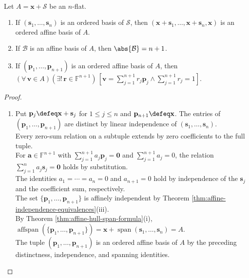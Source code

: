 \begin{theorem} \label{thm:affine-bases-and-barycentric-coordinate-uniqueness} \\
Let $A=\mathbf{x}+\mathcal{S}$ be an $n$-flat.
\begin{enumerate}[label=(\roman*)]
\setlength{\itemsep}{0pt}
\item If $(\mathbf{s}_1,\ldots,\mathbf{s}_n)$ is an ordered basis of $\mathcal{S}$, then $(\mathbf{x}+\mathbf{s}_1,\ldots,\mathbf{x}+\mathbf{s}_n,\mathbf{x})$ is an ordered affine basis of $A$.
\item If $\mathcal{B}$ is an affine basis of $A$, then $\abs{\mathcal{B}}=n+1$.
\item If $(\mathbf{p}_1,\ldots,\mathbf{p}_{n+1})$ is an ordered affine basis of $A$, then $(\forall\,\mathbf{v}\in A)(\exists!\,\mathbf{r}\in\mathbb{F}^{n+1})\,[\mathbf{v}=\sum\limits_{j=1}^{n+1}r_j\mathbf{p}_j\land\sum\limits_{j=1}^{n+1}r_j=1]$.
\end{enumerate}
\begin{proof}
\begin{enumerate}[label=(\roman*)]
\setlength{\itemsep}{0pt}
\item Put $\mathbf{p}_j\defeq\mathbf{x}+\mathbf{s}_j$ for $1\leq j\leq n$ and $\mathbf{p}_{n+1}\defeq\mathbf{x}$. The entries of $(\mathbf{p}_1,\ldots,\mathbf{p}_{n+1})$ are distinct by linear independence of $(\mathbf{s}_1,\ldots,\mathbf{s}_n)$.\\
Every zero-sum relation on a subtuple extends by zero coefficients to the full tuple.\\
For $\mathbf{a}\in\mathbb{F}^{n+1}$ with $\sum\limits_{j=1}^{n+1}a_j\mathbf{p}_j=\mathbf{0}$ and $\sum\limits_{j=1}^{n+1}a_j=0$, the relation $\sum\limits_{j=1}^{n}a_j\mathbf{s}_j=\mathbf{0}$ holds by substitution.\\
The identities $a_1=\cdots=a_n=0$ and $a_{n+1}=0$ hold by independence of the $\mathbf{s}_j$ and the coefficient sum, respectively.\\
The set $\{\mathbf{p}_1,\ldots,\mathbf{p}_{n+1}\}$ is affinely independent by Theorem \ref{thm:affine-independence-equivalences}(iii).\\
By Theorem \ref{thm:affine-hull-span-formula}(i), $\operatorname{affspan}(\{\mathbf{p}_1,\ldots,\mathbf{p}_{n+1}\})=\mathbf{x}+\operatorname{span}(\mathbf{s}_1,\ldots,\mathbf{s}_n)=A$.\\
The tuple $(\mathbf{p}_1,\ldots,\mathbf{p}_{n+1})$ is an ordered affine basis of $A$ by the preceding distinctness, independence, and spanning identities.

\end{enumerate}
\end{proof}
\end{theorem}
